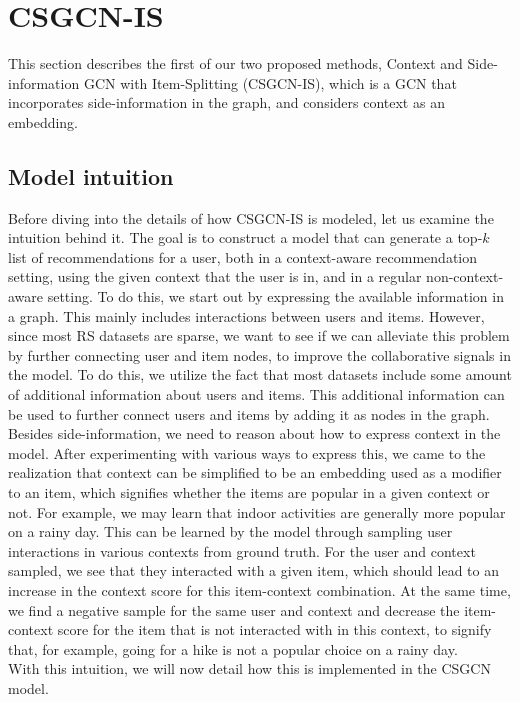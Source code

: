 \section{CSGCN-IS}\label{sec:csgcn_is}
This section describes the first of our two proposed methods, Context and Side-information GCN with Item-Splitting (CSGCN-IS), which is a GCN that incorporates side-information in the graph, and considers context as an embedding.

\subsection{Model intuition}\label{subsec:csgcn_is_intuition}
Before diving into the details of how CSGCN-IS is modeled, let us examine the intuition behind it.
The goal is to construct a model that can generate a top-$k$ list of recommendations for a user, both in a context-aware recommendation setting, using the given context that the user is in, and in a regular non-context-aware setting.
To do this, we start out by expressing the available information in a graph.
This mainly includes interactions between users and items.
However, since most RS datasets are sparse, we want to see if we can alleviate this problem by further connecting user and item nodes, to improve the collaborative signals in the model.
To do this, we utilize the fact that most datasets include some amount of additional information about users and items.
This additional information can be used to further connect users and items by adding it as nodes in the graph.\\
Besides side-information, we need to reason about how to express context in the model.
After experimenting with various ways to express this, we came to the realization that context can be simplified to be an embedding used as a modifier to an item, which signifies whether the items are popular in a given context or not.
For example, we may learn that indoor activities are generally more popular on a rainy day.
This can be learned by the model through sampling user interactions in various contexts from ground truth.
For the user and context sampled, we see that they interacted with a given item, which should lead to an increase in the context score for this item-context combination.
At the same time, we find a negative sample for the same user and context and decrease the item-context score for the item that is not interacted with in this context, to signify that, for example, going for a hike is not a popular choice on a rainy day.\\
With this intuition, we will now detail how this is implemented in the CSGCN model.


